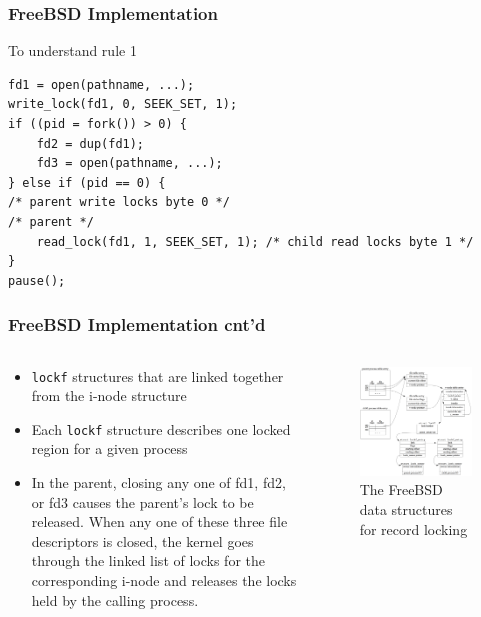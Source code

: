 \documentclass[newPxFont,sthlmFooter,nooffset]{beamer}
\begin{document}
\begin{frame}[fragile,t]
  \frametitle{FreeBSD Implementation}
To understand rule 1
\begin{verbatim}
fd1 = open(pathname, ...);
write_lock(fd1, 0, SEEK_SET, 1);
if ((pid = fork()) > 0) {
    fd2 = dup(fd1);
    fd3 = open(pathname, ...);
} else if (pid == 0) {
/* parent write locks byte 0 */
/* parent */
    read_lock(fd1, 1, SEEK_SET, 1); /* child read locks byte 1 */
}
pause();
\end{verbatim}
\end{frame}

\begin{frame}[t]
  \frametitle{FreeBSD Implementation cnt'd}
\begin{columns}[t]
  \begin{column}{0.4\textwidth}
{\footnotesize
    \begin{itemize}
    \item \texttt{lockf} structures that are linked together from the
      i-node structure
    \item Each \texttt{lockf} structure describes one locked region for a given process
    \item In the parent, closing any one of fd1, fd2, or fd3 causes the parent’s lock to be released. {\footnotesize When any one of these three file descriptors is closed, the kernel goes through the linked list of locks for the corresponding i-node and releases the locks held by the calling process.}
    \end{itemize}
}
  \end{column}
  \begin{column}{0.59\textwidth}
    \begin{figure}[h]
      \includegraphics[width=1\linewidth]{figures/fig14_8-freebsd.png}
      \caption{The FreeBSD data structures for record locking}
    \end{figure}


\end{column}
\end{columns}
\end{frame}
\end{document}
